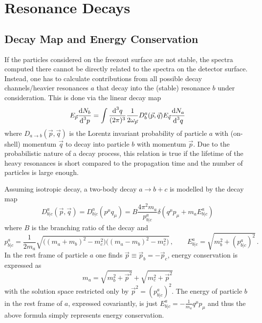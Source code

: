 \chapter{Resonance Decays}

\section{Decay Map and Energy Conservation}

If the particles considered on the freezout surface are not stable, the spectra computed there cannot be directly related to the spectra on the detector surface. Instead, one has to calculate contributions from all possible decay channels/heavier resonances $a$ that decay into the (stable) resonance $b$ under consideration. This is done via the linear decay map
\begin{equation}
    E_{\vec{p}}\frac{\text{d} N_b}{\text{d}^3p}=\int\frac{\text{d}^3q}{(2\pi)^3}\frac{1}{2\omega_{\vec{p}}}D^a_b(\vec{p},\vec{q})E_{\vec{q}}\frac{\text{d} N_a}{\text{d}^3 q}
\end{equation} 
where $D_{a\rightarrow b}(\vec{p},\vec{q})$ is the Lorentz invariant probability of particle $a$ with (on-shell) momentum $\vec{q}$ to decay into particle $b$ with momentum $\vec{p}$. Due to the probabilistic nature of a decay process, this relation is true if the lifetime of the heavy resonances is short compared to the propagation time and the number of particles is large enough.

Assuming isotropic decay, a two-body decay $a\rightarrow b+c$ is modelled by the decay map 
\begin{equation}
    D^a_{b\vert c}(\vec{p},\vec{q})=D^a_{b\vert c}(p^\mu q_\mu)=B\frac{4\pi^2 m_a}{p^a_{b\vert c}}\delta(q^\mu p_\mu+m_a E^a_{b\vert c})
\end{equation}
where $B$ is the branching ratio of the decay and
\begin{equation}
    p^a_{b\vert c}=\frac{1}{2m_a}\sqrt{\big((m_a+m_b)^2-m_c^2\big)\big((m_a-m_b)^2-m_c^2\big)}\,,\qquad E^a_{b\vert c}=\sqrt{m_b^2+(p^a_{b\vert c})^2}\,.
\end{equation}
In the rest frame of particle $a$ one finds $\vec{p}\equiv \vec{p}_b=-\vec{p}_c$, energy conservation is expressed as
\begin{equation}
    m_a=\sqrt{m_b^2+\vec{p}^2}+\sqrt{m_c^2+\vec{p}^2}
\end{equation}
with the solution space restricted only by $\vec{p}^2=(p^a_{b\vert c})^2$. The energy of particle $b$ in the rest frame of $a$, expressed covariantly, is just $E^a_{b\vert c}=-\frac{1}{m_a}q^\mu p_\mu$ and thus the above formula simply represents energy conservation.

